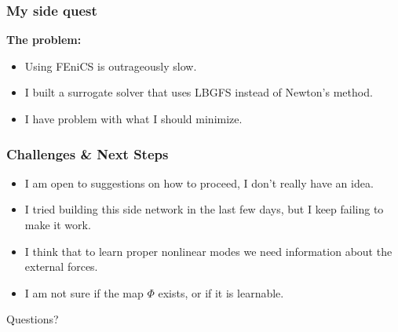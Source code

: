 \documentclass{beamer}
\begin{document}
\begin{frame}
    \frametitle{My side quest}
    \textbf{The problem:}
    \begin{itemize}
        \item Using FEniCS is outrageously slow.
        \item I built a surrogate solver that uses LBGFS instead of Newton's method.
        \item I have problem with what I should minimize. 
    \end{itemize}
\end{frame}

\begin{frame}
    \frametitle{Challenges \& Next Steps}
        \begin{itemize}
            \item I am open to suggestions on how to proceed, I don't really have an idea.
            \item I tried building this side network in the last few days, but I keep failing to make it work.
            \item I think that to learn proper nonlinear modes we need information about the external forces.
            \item I am not sure if the map $\Phi$ exists, or if it is learnable.
        \end{itemize}
\end{frame}

\begin{frame}
    \begin{center}
        \color{blue} \Huge{Questions?}
    \end{center}

\end{frame}
\end{document}
